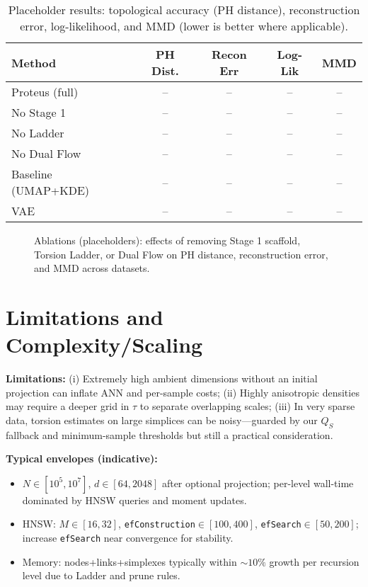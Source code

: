 \documentclass[11pt]{article}
\begin{document}
\begin{table}[t]
    \centering
    \caption{Placeholder results: topological accuracy (PH distance), reconstruction error, log-likelihood, and MMD (lower is better where applicable).}
    \begin{tabular}{lcccc}
        \hline
        Method & PH Dist. & Recon Err & Log-Lik & MMD \\
        \hline
        Proteus (full) & -- & -- & -- & -- \\
        No Stage 1 & -- & -- & -- & -- \\
        No Ladder & -- & -- & -- & -- \\
        No Dual Flow & -- & -- & -- & -- \\
        Baseline (UMAP+KDE) & -- & -- & -- & -- \\
        VAE & -- & -- & -- & -- \\
        \hline
    \end{tabular}
    \label{tab:results}
\end{table}

\begin{figure}[t]
    \centering
    \caption{Ablations (placeholders): effects of removing Stage 1 scaffold, Torsion Ladder, or Dual Flow on PH distance, reconstruction error, and MMD across datasets.}
    \label{fig:ablations}
\end{figure}

\section{Limitations and Complexity/Scaling}
\textbf{Limitations:} (i) Extremely high ambient dimensions without an initial projection can inflate ANN and per-sample costs; (ii) Highly anisotropic densities may require a deeper grid in $\tau$ to separate overlapping scales; (iii) In very sparse data, torsion estimates on large simplices can be noisy---guarded by our $Q_S$ fallback and minimum-sample thresholds but still a practical consideration.

\noindent\textbf{Typical envelopes (indicative):}
\begin{itemize}[leftmargin=1.5em]
    \item $N\in[10^5,10^7]$, $d\in[64,2048]$ after optional projection; per-level wall-time dominated by HNSW queries and moment updates.
    \item HNSW: $M\in[16,32]$, \texttt{efConstruction}$\in[100,400]$, \texttt{efSearch}$\in[50,200]$; increase \texttt{efSearch} near convergence for stability.
    \item Memory: nodes+links+simplexes typically within $\sim10\%$ growth per recursion level due to Ladder and prune rules.
\end{itemize}
\end{document}
